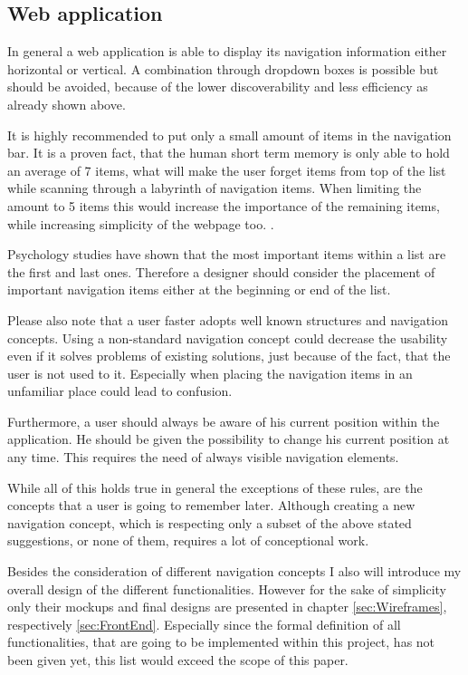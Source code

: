 \subsection{Web application}
\label{sec:UIConceptWeb}

In general a web application is able to display its navigation information either horizontal or vertical. A combination through dropdown boxes is possible but should be avoided, because of the lower discoverability and less efficiency as  already shown above. \cite{Crestodina:2015aa}

It is highly recommended to put only a small amount of items in the navigation bar. It is a proven fact, that the human short term memory is only able to hold an average of 7 items, what will make the user forget items from top of the list while scanning through a labyrinth of navigation items. When limiting the amount to 5 items this would increase the importance of the remaining items, while increasing simplicity of the webpage too. \cite{Crestodina:2015aa}. 

Psychology studies have shown that the most important items within a list are the first and last ones. Therefore a designer should consider the placement of important navigation items either at the beginning or end of the list. \cite{Crestodina:2015aa}

Please also note that a user faster adopts well known structures and navigation concepts. Using a non-standard navigation concept could decrease the usability even if it solves problems of existing solutions, just because of the fact, that the user is not used to it. Especially when placing the navigation items in an unfamiliar place could lead to confusion. \cite{Crestodina:2015aa}

Furthermore, a user should always be aware of his current position within the application. He should be given the possibility to change his current position at any time. This requires the need of always visible navigation elements. 

While all of this holds true in general the exceptions of these rules, are the concepts that a user is going to remember later. Although creating a new navigation concept, which is respecting only a subset of the above stated suggestions, or none of them, requires a lot of conceptional work. \cite{Hampton-Smith:2013aa}

Besides the consideration of different navigation concepts I also will introduce my overall design of the different functionalities. However for the sake of simplicity only their mockups and final designs are presented in chapter \vref{sec:Wireframes}, respectively  \vref{sec:FrontEnd}. Especially since the formal definition of all functionalities, that are going to be implemented within this project, has not been given yet, this list would exceed the scope of this paper.

